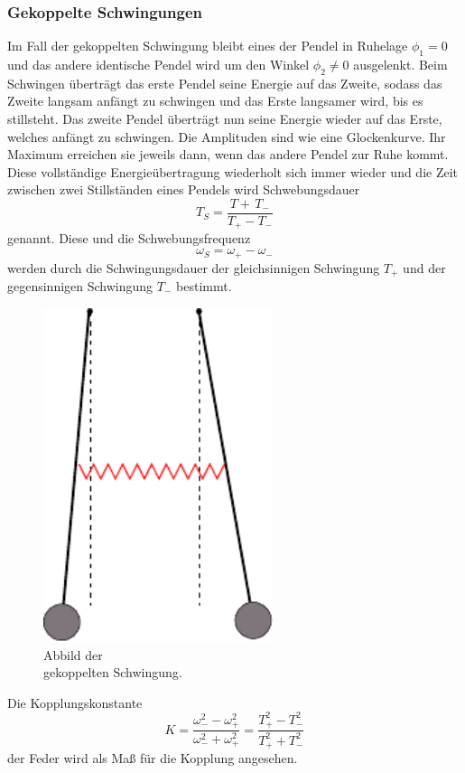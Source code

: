 \subsubsection{Gekoppelte Schwingungen}
\label{subsec:Gekoppelt}
\begin{minipage}[t]{0.5\textwidth}
Im Fall der gekoppelten Schwingung bleibt eines der Pendel in Ruhelage $\phi_1=0$ und das andere identische Pendel wird um den Winkel $\phi_2 \neq 0$ ausgelenkt.
Beim Schwingen überträgt das erste Pendel seine Energie auf das Zweite, sodass das Zweite langsam anfängt zu schwingen und das Erste langsamer wird, bis es stillsteht.
Das zweite Pendel überträgt nun seine Energie wieder auf das Erste, welches anfängt zu schwingen.
Die Amplituden sind wie eine Glockenkurve. 
Ihr Maximum erreichen sie jeweils dann, wenn das andere Pendel zur Ruhe kommt.
Diese vollständige Energieübertragung wiederholt sich immer wieder und die Zeit zwischen zwei Stillständen eines Pendels wird Schwebungsdauer 
\begin{equation}
    T_S=\frac{T+\,T_-}{T_+-T_-}
    \label{eqn:TS}
\end{equation}
genannt. Diese und die Schwebungsfrequenz
\begin{equation}
    \omega_S = \omega_+ - \omega_-
    \label{eqn:omegaS}
\end{equation}
werden durch die Schwingungsdauer der gleichsinnigen Schwingung $T_+$ und der gegensinnigen Schwingung $T_-$ bestimmt.

\end{minipage}
\begin{minipage}[t]{0.5\textwidth}
    \begin{figure}[H]
        \centering
        \includegraphics[width=0.6\textwidth]{build/Abb_3.pdf}
        \caption{Abbild der \\gekoppelten Schwingung. \cite{V106}}
        \label{fig:gekoppelt}
      \end{figure}
\end{minipage}

Die Kopplungskonstante
\begin{equation}
    K = \frac{\omega_-^2 -\omega_+^2}{\omega_-^2 + \omega_+^2} = \frac{T_+^2 - T_-^2}{T_+^2 + T_-^2}
    \label{eqn:K}
\end{equation}
der Feder wird als Maß für die Kopplung angesehen.
